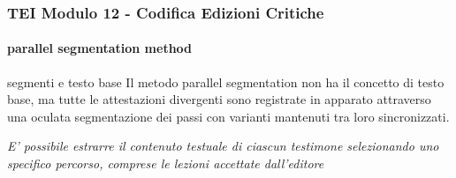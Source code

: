 \begin{frame}
    \frametitle{TEI Modulo 12 - Codifica Edizioni Critiche}
    \framesubtitle{parallel segmentation method}
    \addtocounter{nframe}{1}
    






    \begin{block}{segmenti e testo base}
      Il metodo parallel segmentation non ha il concetto di testo base, ma tutte le attestazioni divergenti sono registrate in apparato attraverso una oculata segmentazione dei passi con varianti mantenuti tra loro sincronizzati.
    \end{block}

    \textit{E' possibile estrarre il contenuto testuale di ciascun testimone selezionando uno specifico percorso, comprese le lezioni accettate dall'editore}

\end{frame}



